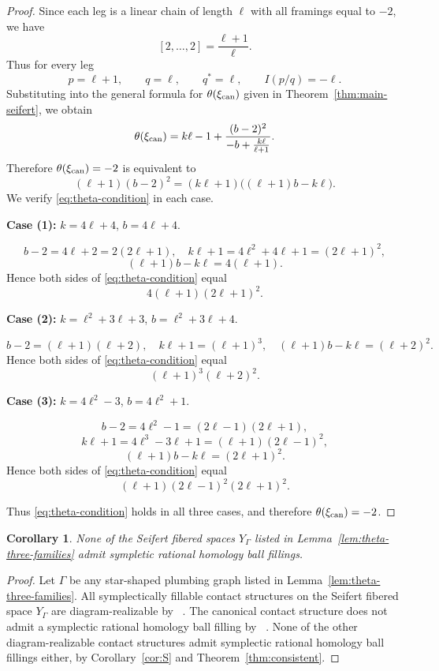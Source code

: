 \documentclass[11pt]{amsart}
\theoremstyle{plain}
\newtheorem{corollary}[theorem]{Corollary}
\theoremstyle{definition}
\theoremstyle{remark}
\begin{document}
\begin{proof}
Since each leg is a linear chain of length $\ell$ with all framings equal to $-2$, we have
\[
[2,\dots,2]=\frac{\ell+1}{\ell}.
\]
Thus for every leg
\[
p=\ell+1,\qquad q=\ell,\qquad q^*=\ell,\qquad I(p/q)=-\ell.
\]
Substituting into the general formula for $\theta(\xi_{\rm can})$ given in Theorem~\ref{thm:main-seifert}, we obtain
\[
\theta(\xi_{\rm can})
=
k\ell-1+\frac{(b-2)^2}{-b+\frac{k\ell}{\ell+1}}.
\]
Therefore $\theta(\xi_{\rm can})=-2$ is equivalent to
\begin{equation}\label{eq:theta-condition}
(\ell+1)(b-2)^2=(k\ell+1)\big((\ell+1)b-k\ell\big).
\end{equation}
We verify \eqref{eq:theta-condition} in each case.

\medskip

\noindent
\textbf{Case (1):} $k=4\ell+4$, $b=4\ell+4$.

\[
b-2=4\ell+2=2(2\ell+1),
\quad
k\ell+1=4\ell^2+4\ell+1=(2\ell+1)^2,
\]
\[
(\ell+1)b-k\ell=4(\ell+1).
\]
Hence both sides of \eqref{eq:theta-condition} equal
\[
4(\ell+1)(2\ell+1)^2.
\]

\medskip

\noindent
\textbf{Case (2):} $k=\ell^2+3\ell+3$, $b=\ell^2+3\ell+4$.

\[
b-2=(\ell+1)(\ell+2),
\quad
k\ell+1=(\ell+1)^3,
\quad
(\ell+1)b-k\ell=(\ell+2)^2.
\]
Hence both sides of \eqref{eq:theta-condition} equal
\[
(\ell+1)^3(\ell+2)^2.
\]

\medskip

\noindent
\textbf{Case (3):} $k=4\ell^2-3$, $b=4\ell^2+1$.

\[
b-2=4\ell^2-1=(2\ell-1)(2\ell+1),
\]
\[
k\ell+1=4\ell^3-3\ell+1=(\ell+1)(2\ell-1)^2,
\]
\[
(\ell+1)b-k\ell=(2\ell+1)^2.
\]
Hence both sides of \eqref{eq:theta-condition} equal
\[
(\ell+1)(2\ell-1)^2(2\ell+1)^2.
\]

Thus \eqref{eq:theta-condition} holds in all three cases, and therefore $\theta(\xi_{\rm can})=-2$.
\end{proof}

\begin{corollary}\label{cor:SEF} 
 None of the Seifert fibered spaces $Y_\Gamma$  listed in Lemma~\ref{lem:theta-three-families} admit sympletic rational homology ball fillings.
 \end{corollary}

\begin{proof} Let $\Gamma$ be any star-shaped plumbing graph  listed   in Lemma~\ref{lem:theta-three-families}. All symplectically fillable contact structures on the Seifert fibered space $Y_\Gamma$ are diagram-realizable by 
~\cite{CavalloMatkovic2026b}. The canonical contact structure does not admit a symplectic rational homology ball filling by ~\cite[Theorem 1.4]{BhupalStipsicz11}. None of the other diagram-realizable contact structures admit symplectic  rational homology ball fillings either, by Corollary~\ref{cor:S} and Theorem~\ref{thm:consistent}. 
\end{proof}
\end{document}
